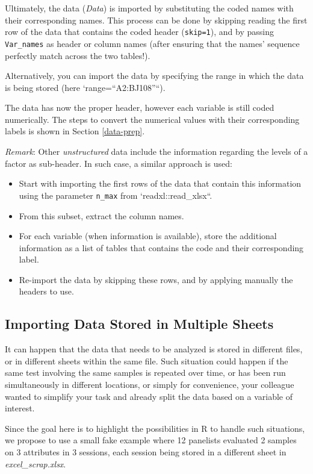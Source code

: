 \documentclass[
]{book}
\providecommand{\tightlist}{%
  \setlength{\itemsep}{0pt}\setlength{\parskip}{0pt}}
\begin{document}
Ultimately, the data (\emph{Data}) is imported by substituting the coded names with their corresponding names. This process can be done by skipping reading the first row of the data that contains the coded header (\texttt{skip=1}), and by passing \texttt{Var\_names} as header or column names (after ensuring that the names' sequence perfectly match across the two tables!).

Alternatively, you can import the data by specifying the range in which the data is being stored (here `range=``A2:BJ108''``).

The data has now the proper header, however each variable is still coded numerically. The steps to convert the numerical values with their corresponding labels is shown in Section \ref{data-prep}.

\emph{Remark}: Other \emph{unstructured} data include the information regarding the levels of a factor as sub-header. In such case, a similar approach is used:

\begin{itemize}
\tightlist
\item
  Start with importing the first rows of the data that contain this information using the parameter \texttt{n\_max} from `readxl::read\_xlsx``.
\item
  From this subset, extract the column names.
\item
  For each variable (when information is available), store the additional information as a list of tables that contains the code and their corresponding label.
\item
  Re-import the data by skipping these rows, and by applying manually the headers to use.
\end{itemize}

\hypertarget{import-mult-sheet}{%
\subsection{Importing Data Stored in Multiple Sheets}\label{import-mult-sheet}}

It can happen that the data that needs to be analyzed is stored in different files, or in different sheets within the same file. Such situation could happen if the same test involving the same samples is repeated over time, or has been run simultaneously in different locations, or simply for convenience, your colleague wanted to simplify your task and already split the data based on a variable of interest.

Since the goal here is to highlight the possibilities in R to handle such situations, we propose to use a small fake example where 12 panelists evaluated 2 samples on 3 attributes in 3 sessions, each session being stored in a different sheet in \emph{excel\_scrap.xlsx}.
\end{document}

